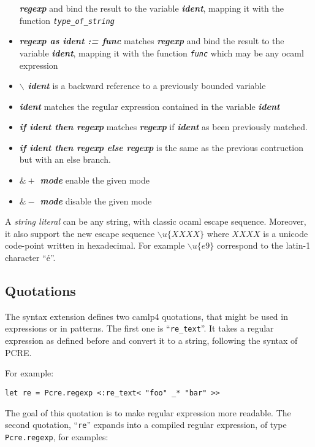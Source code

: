 \documentclass{article}
\begin{document}
\begin{itemize}
  \textbf{\emph{regexp}} and bind the result to the variable
  \textbf{\emph{ident}}, mapping it with the function
  \texttt{\emph{type\_of\_string}}
\item \textbf{\emph{regexp as ident := func}} matches
  \textbf{\emph{regexp}} and bind the result to the variable
  \textbf{\emph{ident}}, mapping it with the function
  \texttt{\emph{func}} which may be any ocaml expression
\item \textbf{\emph{$\backslash$ ident}} is a backward reference to a
  previously bounded variable
\item \textbf{\emph{ident}} matches the regular expression contained
  in the variable \textbf{\emph{ident}}
\item \textbf{\emph{if ident then regexp}} matches
  \textbf{\emph{regexp}} if \textbf{\emph{ident}} as been previously
  matched.
\item \textbf{\emph{if ident then regexp else regexp}} is the same as
  the previous contruction but with an else branch.
\item \textbf{\emph{$\&+$ mode}} enable the given mode
\item \textbf{\emph{$\&-$ mode}} disable the given mode
\end{itemize}

A \emph{string literal} can be any string, with classic ocaml escape
sequence. Moreover, it also support the new escape sequence
$\backslash u\{XXXX\}$ where $XXXX$ is a unicode code-point written in
hexadecimal. For example $\backslash u\{e9\}$ correspond to the
latin-1 character ``é''.

\subsection{Quotations}

The syntax extension defines two camlp4 quotations, that might be used
in expressions or in patterns. The first one is
``\texttt{re\_text}''. It takes a regular expression as defined before
and convert it to a string, following the syntax of PCRE.

For example:

\begin{verbatim}
let re = Pcre.regexp <:re_text< "foo" _* "bar" >>
\end{verbatim}

The goal of this quotation is to make regular expression more
readable. The second quotation, ``\texttt{re}'' expands into a
compiled regular expression, of type \texttt{Pcre.regexp}, for examples:
\end{document}
